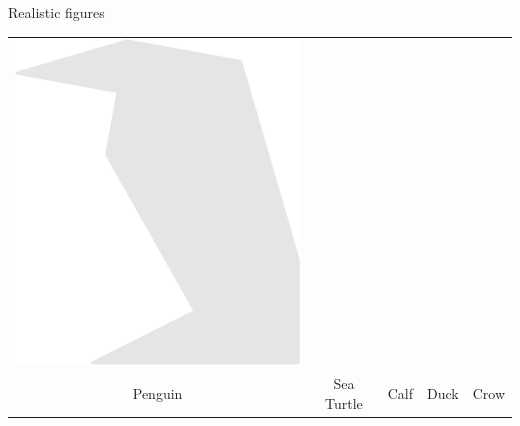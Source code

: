 \documentclass[14pt]{beamer}
\begin{document}
\begin{frame}{Realistic figures}
\begin{center}
{\begin{tabular}{ccccc}
                \includegraphics[scale=0.21]{figures/figure026t.pdf}\\
                Penguin & Sea Turtle & Calf\;\; & Duck & Crow\\
            \end{tabular}}
        \end{center}
    \end{frame}

\end{document}

